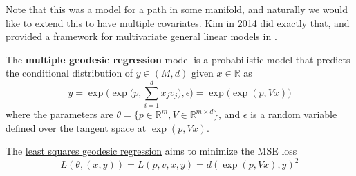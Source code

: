   Note that this was a model for a path in some manifold, and naturally we would like to extend this to have multiple covariates. Kim in 2014 did exactly that, and provided a framework for multivariate general linear models in \cite{2014kim}.  

  \begin{definition}
    \label{def:multiple-geodesic-regression}
 
    The \textbf{multiple geodesic regression} model is a probabilistic model that predicts the conditional distribution of $y \in (M, d)$ given $x \in \mathbb{R}$ as 
    \begin{equation}
      y = \exp \bigg( \exp \Big( p, \sum_{i=1}^d x_j v_j \Big), \epsilon \bigg) = \exp \big( \exp (p, V x)\big)
    \end{equation} 
    where the parameters are $\theta = \{p \in \mathbb{R}^m, V \in \mathbb{R}^{m \times d}\}$, and $\epsilon$ is a \hyperref[prob-def:random-variable]{random variable} defined over the \hyperref[mv-def:tangent-space]{tangent space} at $\exp(p, Vx)$. 
  \end{definition} 

  \begin{definition}
    \label{def:least-squares-geodesic-regression-2}
    The \hyperref[def:least-squares-geodesic-regression]{least squares geodesic regression} aims to minimize the MSE loss 
    \begin{equation}
      L(\theta, (x, y)) = L(p, v, x, y) = d(\exp(p, Vx), y)^2
    \end{equation}
  \end{definition} 

